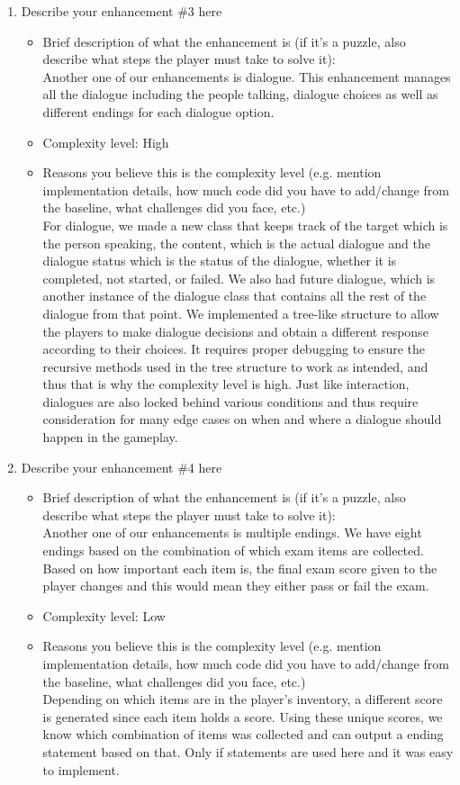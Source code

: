 \documentclass[11pt]{article}
\begin{document}
\begin{enumerate}
\item Describe your enhancement \#3 here
	\begin{itemize}
	\item Brief description of what the enhancement is (if it's a puzzle, also describe what steps the player must take to solve it):
 \\Another one of our enhancements is dialogue. This enhancement manages all the dialogue including the people talking, dialogue choices as well as different endings for each dialogue option.
	\item Complexity level: High
	\item Reasons you believe this is the complexity level (e.g. mention implementation details, how much code did you have to add/change from the baseline, what challenges did you face, etc.)
 \\For dialogue, we made a new class that keeps track of the target which is the person speaking, the content, which is the actual dialogue and the dialogue status which is the status of the dialogue, whether it is completed, not started, or failed. We also had future dialogue, which is another instance of the dialogue class that contains all the rest of the dialogue from that point. We implemented a tree-like structure to allow the players to make dialogue decisions and obtain a different response according to their choices. It requires proper debugging to ensure the recursive methods used in the tree structure to work as intended, and thus that is why the complexity level is high. Just like interaction, dialogues are also locked behind various conditions and thus require consideration for many edge cases on when and where a dialogue should happen in the gameplay. 
	\end{itemize}
 
 \item Describe your enhancement \#4 here
	\begin{itemize}
	\item Brief description of what the enhancement is (if it's a puzzle, also describe what steps the player must take to solve it):
 \\Another one of our enhancements is multiple endings. We have eight endings based on the combination of which exam items are collected. Based on how important each item is, the final exam score given to the player changes and this would mean they either pass or fail the exam. 
	\item Complexity level: Low
	\item Reasons you believe this is the complexity level (e.g. mention implementation details, how much code did you have to add/change from the baseline, what challenges did you face, etc.)
 \\Depending on which items are in the player's inventory, a different score is generated since each item holds a score. Using these unique scores, we know which combination of items was collected and can output a ending statement based on that. Only if statements are used here and it was easy to implement. 
	\end{itemize}



\end{enumerate}
\end{document}
